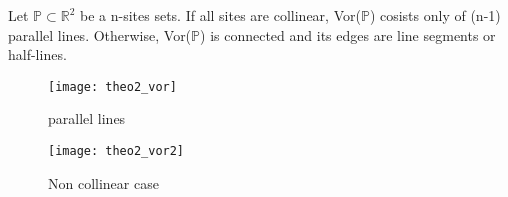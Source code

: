 \documentclass[12pt]{article}
\numberwithin{equation}{section}
\let\bb\mathbb
\newenvironment{coro}[2][]{\begin{box_for_coro}[#1]{#2}}{\end{box_for_coro}}
\let\bb\mathbb
\begin{document}
		\vspace{10mm}
		
		\begin{coro}[title= Theorem 2]{}
			Let $\bb{P} \subset \bb{R}^2$ be a n-sites sets. If all sites are collinear, Vor($\bb{P}$) cosists only of (n-1) parallel lines. Otherwise, Vor($\bb{P}$) is connected and its edges are line segments or half-lines. 
		\end{coro}
		
		\begin{figure}
			\centering
			\texttt{[image: theo2\_vor]}
			\caption{parallel lines}
			\label{fig:vor2}
		\end{figure}
		
		\begin{figure}
			\centering
			\texttt{[image: theo2\_vor2]}
			\caption{Non collinear case}
			\label{fig:vor3}
		\end{figure}
		
\end{document}
